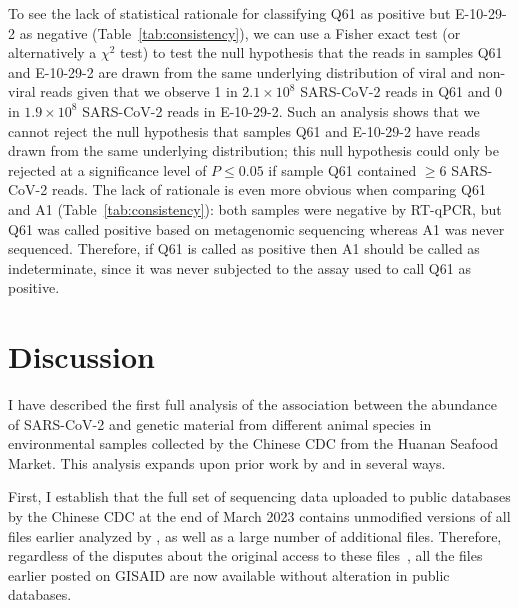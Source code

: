 \documentclass[9pt,twocolumn,twoside]{gsajnl_modified}
\begin{document}
To see the lack of statistical rationale for classifying Q61 as positive but E-10-29-2 as negative (Table~\ref{tab:consistency}), we can use a Fisher exact test (or alternatively a $\chi^2$ test) to test the null hypothesis that the reads in samples Q61 and E-10-29-2 are drawn from the same underlying distribution of viral and non-viral reads given that we observe 1 in $2.1 \times 10^8$ SARS-CoV-2 reads in Q61 and 0 in $1.9 \times 10^8$ SARS-CoV-2 reads in E-10-29-2.
Such an analysis shows that we cannot reject the null hypothesis that samples Q61 and E-10-29-2 have reads drawn from the same underlying distribution; this null hypothesis could only be rejected at a significance level of $P \le 0.05$ if sample Q61 contained $\ge$6 SARS-CoV-2 reads.
The lack of rationale is even more obvious when comparing Q61 and A1 (Table~\ref{tab:consistency}): both samples were negative by RT-qPCR, but Q61 was called positive based on metagenomic sequencing whereas A1 was never sequenced.
Therefore, if Q61 is called as positive then A1 should be called as indeterminate, since it was never subjected to the assay used to call Q61 as positive.

\section{Discussion}
I have described the first full analysis of the association between the abundance of SARS-CoV-2 and genetic material from different animal species in environmental samples collected by the Chinese CDC from the Huanan Seafood Market.
This analysis expands upon prior work by \citet{liu2023surveillance} and \citet{crits2023genetic} in several ways.

First, I establish that the full set of sequencing data uploaded to public databases by the Chinese CDC at the end of March 2023 contains unmodified versions of all files earlier analyzed by \citet{crits2023genetic}, as well as a large number of additional files.
Therefore, regardless of the disputes about the original access to these files~\citep{cohen2023new,gisaid_statement,crits2023genetic}, all the files earlier posted on GISAID are now available without alteration in public databases.
\end{document}
